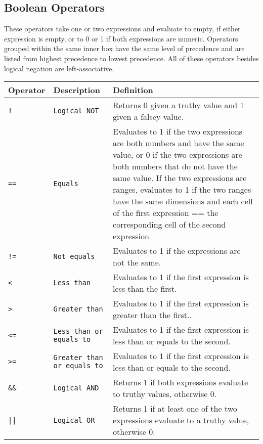 		\subsection{Boolean Operators}
			These operators take one or two expressions and evaluate to empty, if either expression is empty, or to 0 or 1 if both expressions are numeric. Operators grouped within the same inner box have the same level of precedence and are listed from highest precedence to lowest precedence. All of these operators besides logical negation are left-associative.
			\begin{table}[H]
			\begin{tabular}{ |p{2cm}|p{5cm}|p{7cm}|  }
			\hline
			\textbf{Operator} & \textbf{Description} & \textbf{Definition} \\ \hline
			\texttt{!} & \texttt{Logical NOT} & {Returns 0 given a truthy value and 1 given a falsey value.} \\ \hline
			\texttt{==} & \texttt{Equals} & {Evaluates to 1 if the two expressions are both numbers and have the same value, or 0 if the two expressions are both numbers that do not have the same value. If the two expressions are ranges, evaluates to 1 if the two ranges have the same dimensions and each cell of the first expression == the corresponding cell of the second expression} \\
			\texttt{!=} & \texttt{Not equals} & {Evaluates to 1 if the expressions are not the same.} \\
			\texttt{<} & \texttt{Less than} & {Evaluates to 1 if the first expression is less than the first.} \\
			\texttt{>} & \texttt{Greater than} & {Evaluates to 1 if the first expression is greater than the first.}. \\
			\texttt{<=} & \texttt{Less than or equals to} & {Evaluates to 1 if the first expression is less than or equals to the second.} \\
			\texttt{>=} & \texttt{Greater than or equals to} & {Evaluates to 1 if the first expression is less than or equals to the second.} \\ \hline
			\texttt{\&\&} & \texttt{Logical AND} & {Returns 1 if both expressions evaluate to truthy values, otherwise 0.} \\ \hline
			\texttt{||} & \texttt{Logical OR} & {Returns 1 if at least one of the two expressions evaluate to a truthy value, otherwise 0.} \\ \hline
			\end{tabular}
			\end{table}
